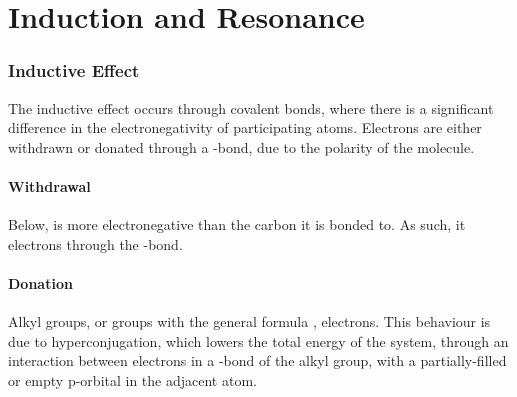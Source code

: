 

\pagebreak
\hypertarget{ChapterInductionAndResonance}{}
\part{Induction and Resonance}

	\section{Inductive Effect}

		The inductive effect occurs through covalent bonds, where there is a significant difference in the electronegativity of
		participating atoms. Electrons are either withdrawn or donated through a \chemsigma-bond, due to the polarity of the molecule.

		\subsection{Withdrawal}

			Below, \ch{\Cl} is more electronegative than the carbon it is bonded to. As such, it
			 electrons through the \chemsigma-bond.



		\pagebreak
		\subsection{Donation}

			Alkyl groups, or groups with the general formula ,  electrons. This behaviour
			is due to hyperconjugation, which lowers the total energy of the system, through an interaction between electrons in a
			\chemsigma-bond of the alkyl group, with a partially-filled or empty p-orbital in the adjacent atom.





